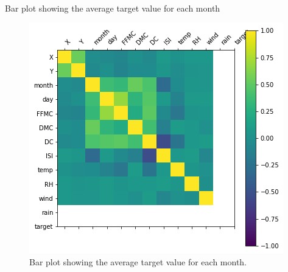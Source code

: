 \clearpage
Bar plot showing the average target value for each month
\begin{figure}[ht]
    \centering
    \includegraphics[scale=1.0]{figures/output_18_0.png}
    \caption{Bar plot showing the average target value for each month.}
    \label{fig:example-01}
\end{figure}


